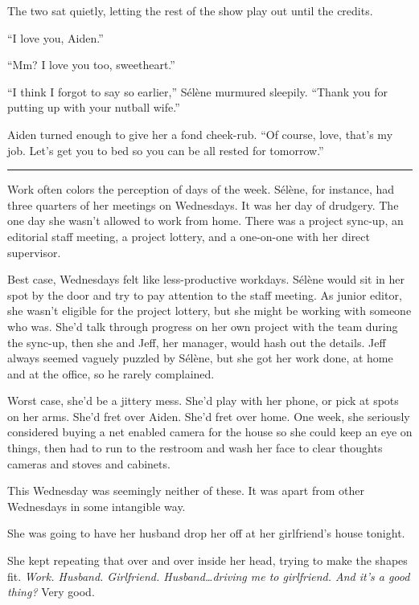 The two sat quietly, letting the rest of the show play out until the credits.

``I love you, Aiden.''

``Mm? I love you too, sweetheart.''

``I think I forgot to say so earlier,'' Sélène murmured sleepily. ``Thank you for putting up with your nutball wife.''

Aiden turned enough to give her a fond cheek-rub. ``Of course, love, that's my job. Let's get you to bed so you can be all rested for tomorrow.''

\begin{center}\rule{0.5\linewidth}{\linethickness}\end{center}

Work often colors the perception of days of the week. Sélène, for instance, had three quarters of her meetings on Wednesdays. It was her day of drudgery. The one day she wasn't allowed to work from home. There was a project sync-up, an editorial staff meeting, a project lottery, and a one-on-one with her direct supervisor.

Best case, Wednesdays felt like less-productive workdays. Sélène would sit in her spot by the door and try to pay attention to the staff meeting. As junior editor, she wasn't eligible for the project lottery, but she might be working with someone who was. She'd talk through progress on her own project with the team during the sync-up, then she and Jeff, her manager, would hash out the details. Jeff always seemed vaguely puzzled by Sélène, but she got her work done, at home and at the office, so he rarely complained.

Worst case, she'd be a jittery mess. She'd play with her phone, or pick at spots on her arms. She'd fret over Aiden. She'd fret over home. One week, she seriously considered buying a net enabled camera for the house so she could keep an eye on things, then had to run to the restroom and wash her face to clear thoughts cameras and stoves and cabinets.

This Wednesday was seemingly neither of these. It was apart from other Wednesdays in some intangible way.

She was going to have her husband drop her off at her girlfriend's house tonight.

She kept repeating that over and over inside her head, trying to make the shapes fit. \emph{Work. Husband. Girlfriend. Husband\ldots{}driving me to girlfriend. And it's a good thing?} Very good.

